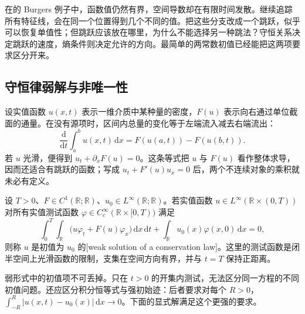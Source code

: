 
在的 Burgers 例子中，函数值仍然有界，空间导数却在有限时间发散。继续追踪所有特征线，会在同一个位置得到几个不同的值。把这些分支改成一个跳跃，似乎可以恢复单值性；但跳跃应该放在哪里，为什么不能选择另一种跳法？守恒关系决定跳跃的速度，熵条件则决定允许的方向。最简单的两常数初值已经能把这两项要求区分开来。

\subsection{守恒律弱解与非唯一性}
\label{b2:subsec:070501}

设实值函数 \(u(x,t)\) 表示一维介质中某种量的密度，\(F(u)\) 表示向右通过单位截面的通量。在没有源项时，区间内总量的变化等于左端流入减去右端流出：
\[
 \frac{\mathrm d}{\mathrm dt}\int_a^b u(x,t)\,\mathrm dx
 =F(u(a,t))-F(u(b,t)).
\]
若 \(u\) 光滑，便得到 \(u_t+\partial_xF(u)=0\)。这条等式把 \(u\) 与 \(F(u)\) 看作整体求导，因而还适合有跳跃的函数；写成 \(u_t+F'(u)u_x=0\) 后，两个不连续对象的乘积就未必有定义。

\begin{definition}\label{b2:def:07-conservation-weak}
设 \(T>0\)、\(F\in C^1(\mathbb R;\mathbb R)\)、\(u_0\in L^\infty(\mathbb R;\mathbb R)\)。若实值函数
\(u\in L^\infty(\mathbb R\times(0,T))\) 对所有实值测试函数
\(\varphi\in C_c^\infty(\mathbb R\times[0,T))\) 满足
\begin{equation}\label{b2:eq:07-conservation-weak}
 \int_0^T\!\int_{\mathbb R}
 \bigl(u\varphi_t+F(u)\varphi_x\bigr)\,\mathrm dx\,\mathrm dt
 +\int_{\mathbb R}u_0(x)\varphi(x,0)\,\mathrm dx=0,
\end{equation}
则称 \(u\) 是初值为 \(u_0\) 的[weak solution of a conservation law]。这里的测试函数是闭半空间上光滑函数的限制，支集在空间方向有界，并与 \(t=T\) 保持正距离。
\end{definition}

弱形式中的初值项不可丢掉。只在 \(t>0\) 的开集内测试，无法区分同一方程的不同初值问题。还应区分积分恒等式与强初始迹：后者要求对每个 \(R>0\)，\(\int_{-R}^R|u(x,t)-u_0(x)|\,\mathrm dx\to0\)。下面的显式解满足这个更强的要求。

